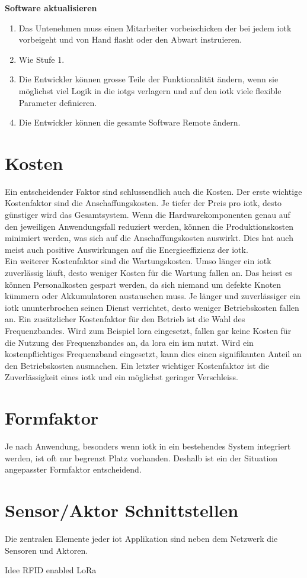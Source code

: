 \textbf{Software aktualisieren}
\begin{enumerate}  
  \item Das Untenehmen muss einen Mitarbeiter vorbeischicken der bei jedem \gls{iotk} vorbeigeht und von Hand flasht oder den Abwart instruieren.
  \item Wie Stufe 1.
  \item Die Entwickler können grosse Teile der Funktionalität ändern, wenn sie möglichst viel Logik in die \glspl{iotg} verlagern und auf den \gls{iotk} viele flexible Parameter definieren.
  \item Die Entwickler können die gesamte Software Remote ändern.
\end{enumerate}

\section{Kosten}

Ein entscheidender Faktor sind schlussendlich auch die Kosten. Der erste wichtige Kostenfaktor sind die Anschaffungskosten. Je tiefer der Preis pro \gls{iotk}, desto günstiger wird das Gesamtsystem. Wenn die Hardwarekomponenten genau auf den jeweiligen Anwendungsfall reduziert werden, können die Produktionskosten minimiert werden, was sich auf die Anschaffungskosten auswirkt. Dies hat auch meist auch positive Auswirkungen auf die Energieeffizienz der \gls{iotk}.\\
Ein weiterer Kostenfaktor sind die Wartungskosten. Umso länger ein \gls{iotk} zuverlässig läuft, desto weniger Kosten für die Wartung fallen an. Das heisst es können Personalkosten gespart werden, da sich niemand um defekte Knoten kümmern oder Akkumulatoren austauschen muss. Je länger und zuverlässiger ein \gls{iotk} ununterbrochen seinen Dienst verrichtet, desto weniger Betriebskosten fallen an. Ein zusätzlicher Kostenfaktor für den Betrieb ist die Wahl des Frequenzbandes. Wird zum Beispiel \gls{lora} eingesetzt, fallen gar keine Kosten für die Nutzung des Frequenzbandes an, da \gls{lora} ein \gls{ism} nutzt. Wird ein kostenpflichtiges Frequenzband eingesetzt, kann dies einen signifikanten Anteil an den Betriebskosten ausmachen. Ein letzter wichtiger Kostenfaktor ist die Zuverlässigkeit eines \gls{iotk} und ein möglichst geringer Verschleiss.

\section{Formfaktor}

Je nach Anwendung, besonders wenn \gls{iotk} in ein bestehendes System integriert werden, ist oft nur begrenzt Platz vorhanden. Deshalb ist ein der Situation angepasster Formfaktor entscheidend.

\section{Sensor/Aktor Schnittstellen}

Die zentralen Elemente jeder \gls{iot} Applikation sind neben dem Netzwerk die Sensoren und Aktoren. 

Idee RFID enabled LoRa

